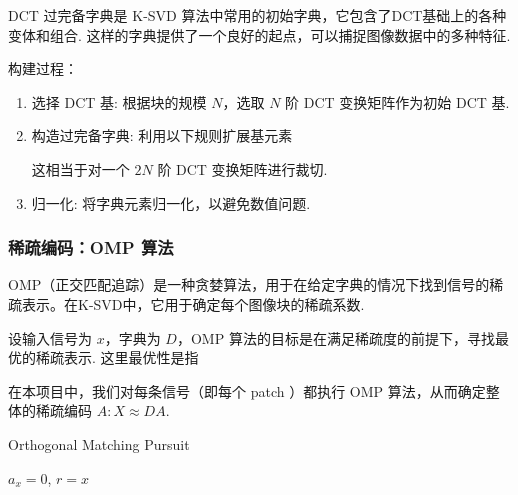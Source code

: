 \documentclass[a4paper,11pt]{article}
\begin{document}
DCT 过完备字典是 K-SVD 算法中常用的初始字典，它包含了DCT基础上的各种变体和组合. 这样的字典提供了一个良好的起点，可以捕捉图像数据中的多种特征.

构建过程：
\begin{enumerate}
	\item 选择 DCT 基: 根据块的规模 $N$，选取 $N$ 阶 DCT 变换矩阵作为初始 DCT 基. 
	
	\item 构造过完备字典: 利用以下规则扩展基元素
	
	这相当于对一个 $2N$ 阶 DCT 变换矩阵进行裁切. 
	\item 归一化: 将字典元素归一化，以避免数值问题. 
\end{enumerate}

\subsubsection{稀疏编码：OMP 算法}
OMP（正交匹配追踪）是一种贪婪算法，用于在给定字典的情况下找到信号的稀疏表示。在K-SVD中，它用于确定每个图像块的稀疏系数. 

设输入信号为 $x$，字典为 $D$，OMP 算法的目标是在满足稀疏度的前提下，寻找最优的稀疏表示. 这里最优性是指

在本项目中，我们对每条信号（即每个 patch ）都执行 OMP 算法，从而确定整体的稀疏编码 $A: X \approx DA$. 

\begin{algorithm}[H]
	\caption{Orthogonal Matching Pursuit}
	\label{alg:omp}
	
	
	$a_x = 0$, $r = x$ 
\end{algorithm}
\end{document}
